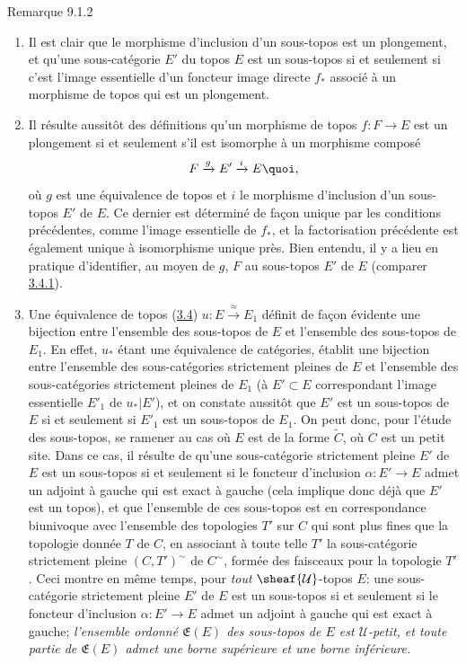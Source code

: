 \documentclass[10pt]{../fichiers-configuration-latex/smfart}
\begin{document}
\begin{enonce*}[remark]{Remarque 9.1.2}
\begin{enumerate}
\renewcommand{\theenumi}{\alph{enumi}}
\renewcommand{\labelenumi}{\theenumi)}
\item Il est clair que le morphisme d'inclusion d'un sous-topos est un
plongement, et qu'une sous-catégorie $E'$ du topos $E$ est un
sous-topos si et seulement si c'est l'image essentielle d'un
foncteur image directe $f_{\ast}$ associé à un morphisme de topos
 qui est un plongement.

\item Il résulte aussitôt des définitions qu'un morphisme de topos
$f:F\rightarrow E$ est un plongement si et seulement s'il est
isomorphe à un morphisme composé
$$
F\xrightarrow{g}E'\xrightarrow{i}E{\quoi},
$$
où $g$ est une équivalence de topos et $i$ le morphisme d'inclusion
d'un sous-topos $E'$ de $E$. Ce dernier est déterminé de façon
unique par les conditions précédentes, comme l'image essentielle de
$f_{\ast}$, et la factorisation précédente est également unique à
isomorphisme unique près. Bien entendu, il y a lieu en pratique
d'identifier, au moyen de $g$, $F$ au sous-topos $E'$ de $E$
(comparer \hyperref[IV.subsubsec3.4.1]{3.4.1}).

\item Une équivalence de topos (\hyperref[IV.subsec3.4]{3.4})
  $u:E\xrightarrow{\approx}E_1$
définit de façon évidente une bijection entre l'ensemble des
sous-topos de $E$ et l'ensemble des sous-topos de $E_1$. En effet,
$u_{\ast}$ étant une équivalence de catégories,\pageoriginale
établit une bijection entre l'ensemble des sous-catégories
strictement pleines de $E$ et l'ensemble des sous-catégories
strictement pleines de $E_1$ (à $E'\subset E$ correspondant l'image
essentielle $E'_1$ de $u_{\ast}| E'$), et on constate aussitôt que
$E'$ est un sous-topos de $E$ si et seulement si $E'_1$ est un
sous-topos de $E_1$. On peut donc, pour l'étude des sous-topos, se
ramener au cas où $E$ est de la forme $\widetilde{C}$, où $C$ est un
petit site. Dans ce cas, il résulte de  qu'une
sous-catégorie strictement pleine $E'$ de $E$ est un sous-topos si
et seulement si le foncteur d'inclusion $\alpha:E'\rightarrow E$
admet un adjoint à gauche qui est exact à gauche (cela implique donc
déjà que $E'$ est un topos), et que l'ensemble de ces sous-topos est
en correspondance biunivoque avec l'ensemble des topologies $T'$ sur
$C$ qui sont plus fines que la topologie donnée $T$ de $C$, en
associant à toute telle $T'$ la sous-catégorie strictement pleine
$(C,T')^{\sim}$ de $C^{\sim}$, formée des faisceaux pour la
topologie $T'$. Ceci montre en même temps, pour \emph{tout}
$\sheaf{\mathcal{U}}$-topos $E$: une sous-catégorie strictement
pleine $E'$ de $E$ est un sous-topos si et seulement si le foncteur
d'inclusion $\alpha:E'\rightarrow E$ admet un adjoint à gauche qui
est exact à gauche; \emph{l'ensemble ordonné $\mathfrak{E}(E)$ des
sous-topos de $E$ est $\mathcal{U}$-petit, et toute partie de
$\mathfrak{E}(E)$ admet une borne supérieure et une borne
inférieure.}


\end{enumerate}
\end{enonce*}
\end{document}
